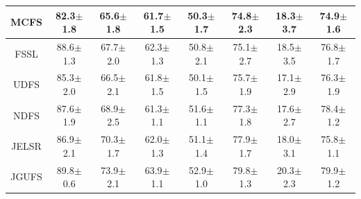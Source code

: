 \documentclass[a0paper,portrait]{baposter}
\begin{document}
\begin{poster}
{\begin{table}[H]
\begin{tabular}{|c|c|c|c|c|c|c|c|}
	MCFS &82.3$\pm$1.8 &65.6$\pm$1.8 &61.7$\pm$1.5 &50.3$\pm$1.7 &74.8$\pm$2.3 &18.3$\pm$3.7 &74.9$\pm$1.6\\ \hline
	FSSL &88.6$\pm$1.3 &67.7$\pm$2.0 &62.3$\pm$1.3 &50.8$\pm$2.1 &75.1$\pm$2.7 &18.5$\pm$3.5 &76.8$\pm$1.7\\ \hline
	UDFS &85.3$\pm$2.0 &66.5$\pm$2.1 &61.8$\pm$1.5 &50.1$\pm$1.5 &75.7$\pm$1.9 &17.1$\pm$2.9 &76.3$\pm$1.9\\ \hline
	NDFS &87.6$\pm$1.9 &68.9$\pm$2.5 &61.3$\pm$1.1 &51.6$\pm$1.1 &77.3$\pm$1.8 &17.6$\pm$2.7 &78.4$\pm$1.2\\ \hline
	JELSR &86.9$\pm$2.1 &70.3$\pm$1.7 &62.0$\pm$1.3 &51.1$\pm$1.4 &77.9$\pm$1.7 &18.0$\pm$3.1 &75.8$\pm$1.1\\ \hline
	JGUFS &89.8$\pm$0.6 &73.9$\pm$2.1 &63.9$\pm$1.1 &52.9$\pm$1.0 &79.8$\pm$1.3 &20.3$\pm$2.3 &79.9$\pm$1.2\\ \hline
  \end{tabular}
  \label{tab:results}
\end{table}

}


\end{poster}
\end{document}
